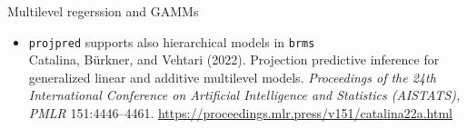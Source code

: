 \documentclass[t]{beamer}
\begin{document}
  



  

  



\begin{frame}{Multilevel regerssion and GAMMs}
  

  \begin{itemize}
  \item \texttt{projpred} supports also hierarchical models in \texttt{brms}\\
  {\footnotesize  Catalina, Bürkner, and Vehtari (2022). Projection predictive inference for generalized linear and additive multilevel models. \textit{Proceedings of the 24th International Conference on Artificial Intelligence and Statistics (AISTATS), PMLR} 151:4446–4461. \url{https://proceedings.mlr.press/v151/catalina22a.html}}
  \end{itemize}
  
\end{frame}
\end{document}
